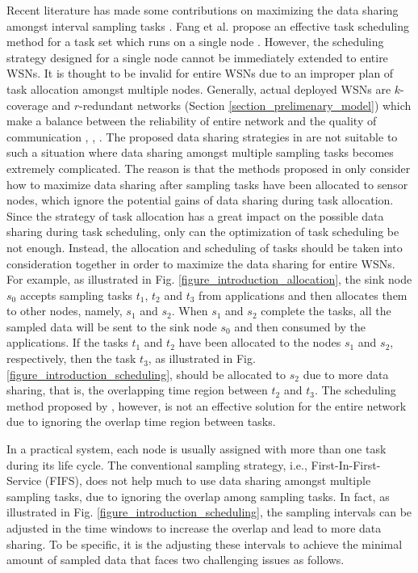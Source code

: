 \documentclass[prodmode,acmtosn]{acmsmall}
\begin{document}
Recent literature has made some contributions on maximizing the data sharing amongst interval sampling tasks \cite{2013fang}. Fang et al. propose an effective task scheduling method for a task set which runs on a single node \cite{2013fang}. However, the scheduling strategy designed for a single node cannot be immediately extended to entire WSNs. It is thought to be invalid for entire WSNs due to an improper plan of task allocation amongst multiple nodes. Generally, actual deployed WSNs are $k$-coverage and $r$-redundant networks (Section \ref{section_prelimenary_model}) which make a balance between the reliability of entire network and the quality of communication \cite{2005_coverage_problem}, \cite{2007_undergroundMonitoring}, \cite{2013_TPDS_coverage}. The proposed data sharing strategies in \cite{2013fang} are not suitable to such a situation where data sharing amongst multiple sampling tasks becomes extremely complicated. The reason is that the methods proposed in \cite{2013fang} only consider how to maximize data sharing after sampling tasks have been allocated to sensor nodes, which ignore the potential gains of data sharing during task allocation. Since the strategy of task allocation has a great impact on the possible data sharing during task scheduling, only can the optimization of task scheduling be not enough. Instead, the allocation and scheduling of tasks should be taken into consideration together in order to maximize the data sharing for entire WSNs. For example, as illustrated in Fig. \ref{figure_introduction_allocation}, the sink node $s_0$ accepts sampling tasks $t_1$, $t_2$ and $t_3$ from applications and then allocates them to other nodes, namely, $s_1$ and $s_2$. When $s_1$ and $s_2$ complete the tasks, all the sampled  data will be sent to the sink node $s_0$ and then consumed by the applications. If the tasks $t_1$ and $t_2$ have been allocated to the nodes $s_1$ and $s_2$, respectively, then the task $t_3$, as illustrated in Fig. \ref{figure_introduction_scheduling}, should be allocated to $s_2$ due to more data sharing, that is, the overlapping time region between $t_2$ and $t_3$.  The scheduling method proposed by \cite{2013fang}, however, is not an effective solution for the entire network due to ignoring the overlap time region between tasks.

In a practical system, each node is usually assigned with more than one task during its life cycle. The conventional sampling strategy, i.e., First-In-First-Service (FIFS), does not help much to use data sharing amongst multiple sampling tasks, due to ignoring the overlap among sampling tasks. In fact, as illustrated in Fig. \ref{figure_introduction_scheduling}, the sampling intervals can be adjusted in the time windows to increase the overlap and lead to more data sharing. To be specific, it is the adjusting these intervals to achieve the minimal amount of sampled data that faces two challenging issues as follows.
\end{document}
